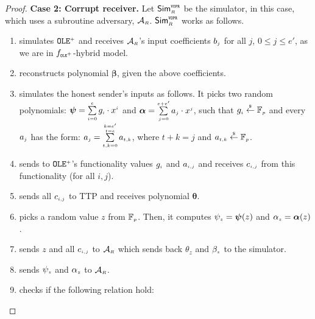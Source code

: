 \begin{proof}
\noindent\textbf{Case 2: Corrupt receiver.}  Let $\mathsf{Sim}^{\scriptscriptstyle\mathtt{VOPR}}_{\scriptscriptstyle R}$ be the simulator, in this case, which uses a subroutine adversary, $\mathcal{A}_{\scriptscriptstyle R}$. $\mathsf{Sim}^{\scriptscriptstyle \mathtt{VOPR}}_{\scriptscriptstyle R}$ works as follows. 
%
\begin{enumerate}
%
\item simulates ${\mathtt{OLE}^{\scriptscriptstyle +}}$ and receives $\mathcal{A}_{\scriptscriptstyle R}$'s input coefficients $b_{\scriptscriptstyle j}$ for all $j$, $0\leq j \leq e'$, as we are in $f_{\scriptscriptstyle \mathtt{OLE}^{\scriptscriptstyle +}}$-hybrid model.
%
\item reconstructs polynomial $\bm \beta$, given the above coefficients. 
%
\item simulates the honest sender's inputs as follows. 
It picks two random polynomials: ${\bm\psi}=\sum\limits^{\scriptscriptstyle e}_{\scriptscriptstyle i=0}{g}_{\scriptscriptstyle i}\cdot x^{\scriptscriptstyle i}$ and  ${\bm\alpha}=\sum\limits^{\scriptscriptstyle e+e'}_{\scriptscriptstyle j=0}{a}_{\scriptscriptstyle j}\cdot x^{\scriptscriptstyle j}$, such that ${g}_{\scriptscriptstyle i}\stackrel{\scriptscriptstyle \$}\leftarrow \mathbb{F}_{\scriptscriptstyle p}$ and  every $a_{\scriptscriptstyle j}$ has the  form: $a_{\scriptscriptstyle j}=\sum\limits^{\substack{\scriptscriptstyle k=e'\\ \scriptscriptstyle t=e}}_{\scriptscriptstyle t,k=0} a_{\scriptscriptstyle t,k}$,  where $t+k=j$ and $a_{\scriptscriptstyle t,k}\stackrel{\scriptscriptstyle \$}\leftarrow \mathbb{F}_{\scriptscriptstyle p}$. 
\item sends to ${\mathtt{OLE}^{\scriptscriptstyle +}}$'s functionality values $g_{\scriptscriptstyle i}$ and $a_{\scriptscriptstyle i,j}$ and receives   $c_{\scriptscriptstyle i,j}$ from this functionality (for all $i,j$).
%
\item sends all ${c}_{\scriptscriptstyle i,j}$ to TTP and receives polynomial ${\bm\theta}$. 
%
\item picks a random value $ z$ from $\mathbb{F}_{\scriptscriptstyle p}$. Then, it computes $ \psi_{\scriptscriptstyle  z} = {\bm\psi}(  z)$ and $\alpha_{\scriptscriptstyle  z}= {\bm\alpha}(z)$. 
%
\item sends $ z$ and all ${c}_{\scriptscriptstyle i,j}$ to $\mathcal{A}_{\scriptscriptstyle R}$ which sends back $\theta_{ z}$ and $\beta_{\scriptscriptstyle z}$ to the simulator. 
%
\item sends  $ \psi_{\scriptscriptstyle  z}$ and $\alpha_{\scriptscriptstyle z}$ to $\mathcal{A}_{\scriptscriptstyle R}$. 
%
\item checks if the following relation hold:


\end{enumerate}
\end{proof}
